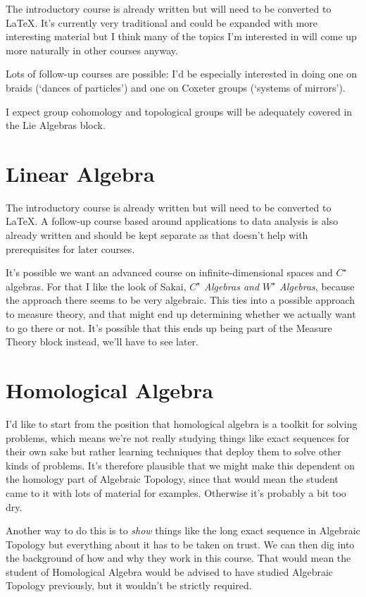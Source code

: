 \documentclass[article]{article}
\begin{document}
The introductory course is already written but will need to be converted to \LaTeX. It's currently very traditional and could be expanded with more interesting material but I think many of the topics I'm interested in will come up more naturally in other courses anyway.

Lots of follow-up courses are possible: I'd be especially interested in doing one on braids (`dances of particles') and one on Coxeter groups (`systems of mirrors'). 

I expect group cohomology and topological groups will be adequately covered in the Lie Algebras block.

\section{Linear Algebra}

The introductory course is already written but will need to be converted to \LaTeX. A follow-up course based around applications to data analysis is also already written and should be kept separate as that doesn't help with prerequisites for later courses.

It's possible we want an advanced course on infinite-dimensional spaces and $C^\star$ algebras. For that I like the look of Sakai, \textit{$C^\star$ Algebras and $W^\star$ Algebras}, because the approach there seems to be very algebraic. This ties into a possible approach to measure theory, and that might end up determining whether we actually want to go there or not. It's possible that this ends up being part of the Measure Theory block instead, we'll have to see later.

\section{Homological Algebra}

I'd like to start from the position that homological algebra is a toolkit for solving problems, which means we're not really studying things like exact sequences for their own sake but rather learning techniques that deploy them to solve other kinds of problems. It's therefore plausible that we might make this dependent on the homology part of Algebraic Topology, since that would mean the student came to it with lots of material for examples. Otherwise it's probably a bit too dry.

Another way to do this is to \emph{show} things like the long exact sequence in Algebraic Topology but everything about it has to be taken on trust. We can then dig into the background of how and why they work in this course. That would mean the student of Homological Algebra would be advised to have studied Algebraic Topology previously, but it wouldn't be strictly required.
\end{document}
